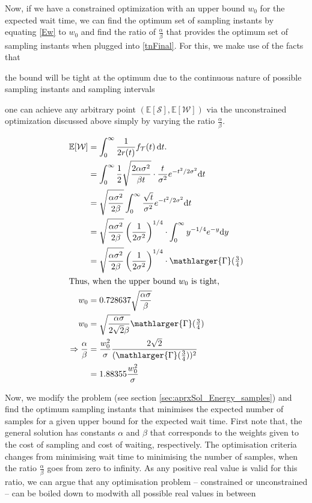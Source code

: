 Now, if we have a constrained optimization with an upper bound $w_0$ for the expected wait time, we can find the optimum set of sampling instants by equating \cref{Ew} to $w_0$ and find the ratio of $\frac{\alpha}{\beta}$ that provides the optimum set of sampling instants when plugged into \cref{tnFinal}.
For this, we make use of the facts that
\begin{enumerate*}[itemjoin={{, }}, itemjoin*={{, and }}]
    \item the bound will be tight at the optimum due to the continuous nature of possible sampling instants and sampling intervals
    \item one can achieve any arbitrary point $(\mathbb{E}[\mathcal{S}],\mathbb{E}[\mathcal{W}])$ via the unconstrained optimization discussed above simply by varying the ratio $\frac{\alpha}{\beta}$.
\end{enumerate*}
\begin{alignat*}{1}
\mathbb{E}[\mathcal{W}]&=\int_{0}^{\infty}\dfrac{1}{2r(t)}f_\mathcal{T}(t)\,\mathrm{d}t.\nonumber\\
&=\int_{0}^{\infty}\frac{1}{2}\sqrt{\frac{2\alpha\sigma^2}{\beta t}}\cdot \frac{t}{\sigma^2}e^{-{t^2}/{2\sigma^2}}\mathrm{d}t\\
&=\sqrt{\frac{\alpha\sigma^2}{2\beta}}\int_{0}^{\infty}\frac{\sqrt{t}}{\sigma^2}e^{-{t^2}/{2\sigma^2}}\mathrm{d}t\\
&=\sqrt{\frac{\alpha\sigma^2}{2\beta}}\left({\frac{1}{{2}\sigma^2}}\right)^{1/4}\cdot\int_{0}^{\infty}y^{-1/4}e^{-y}\mathrm{d}y\\
&=\sqrt{\frac{\alpha\sigma^2}{2\beta}}\left({\frac{1}{{2}\sigma^2}}\right)^{1/4}\cdot\mathlarger{\Gamma}(\tfrac{3}{4})\\
\intertext{Thus, when the upper bound $w_0$ is tight,}
w_0&=0.728637\sqrt{\frac{\alpha\sigma}{\beta}}\\
w_0&=\sqrt{\frac{\alpha\sigma}{2\sqrt{2}\beta}}\mathlarger{\Gamma}(\tfrac{3}{4})\\
\Rightarrow\frac{\alpha}{\beta}&=\frac{w_0^2}{\sigma}\frac{2\sqrt{2}}{(\mathlarger{\Gamma}(\tfrac{3}{4}))^2}\\&=1.88355\frac{w_0^2}{\sigma}
\end{alignat*}

Now, we modify the problem (see section \ref{sec:aprxSol_Energy_samples}) and find the optimum sampling instants that minimises the expected number of samples for a given upper bound for the expected wait time. First note that, the general solution has constants $\alpha$ and $\beta$ that corresponds to the weights given to the cost of sampling and cost of waiting, respectively. The optimisation criteria changes from minimising wait time to minimising the number of samples, when the ratio $\frac{\alpha}{\beta}$ goes from zero to infinity. As any positive real value is valid for this ratio, we can argue that any optimisation problem -- constrained or unconstrained -- can be boiled down to modwith all possible real values in between 

